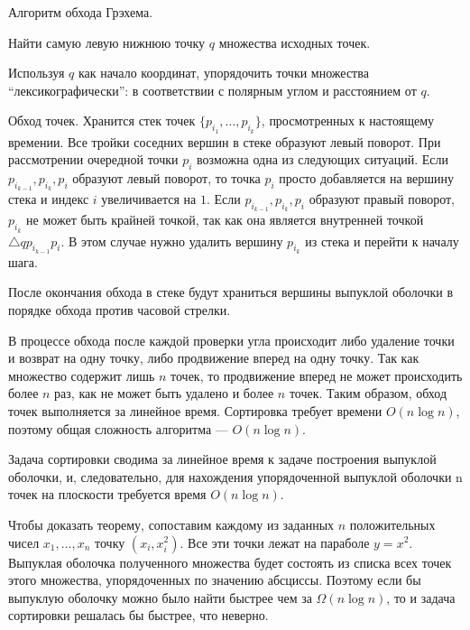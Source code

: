 \begin{algorithm}{Алгоритм обхода Грэхема.}
\item Найти самую левую нижнюю точку $q$ множества исходных точек.
\item Используя $q$ как начало координат, упорядочить точки множества
  ``лексикографически'': в соответствии с полярным углом и расстоянием
  от $q$.
\item Обход точек. Хранится стек точек $\{p_{i_1}, \ldots,p_{i_k}\}$,
  просмотренных к настоящему времении. Все тройки соседних вершин в
  стеке образуют левый поворот. При рассмотрении очередной точки $p_i$
  возможна одна из следующих ситуаций. Если $p_{i_{k-1}},p_{i_k},p_i$
  образуют левый поворот, то точка $p_i$ просто добавляется на вершину
  стека и индекс $i$ увеличивается на $1$.
  Если $p_{i_{k-1}},p_{i_k},p_i$ образуют правый поворот, $p_{i_k}$ не
  может быть крайней точкой, так как она является внутренней точкой
  $\triangle qp_{i_{k-1}}p_i$. В этом случае нужно удалить вершину
  $p_{i_k}$ из стека и перейти к началу шага.
\item После окончания обхода в стеке будут храниться вершины выпуклой
  оболочки в порядке обхода против часовой стрелки.
\end{algorithm}

В процессе обхода после каждой проверки угла происходит либо удаление
точки и возврат на одну точку, либо продвижение вперед на одну точку.
Так как множество содержит лишь $n$ точек, то продвижение вперед не
может происходить более $n$ раз, как не может быть удалено и более $n$
точек. Таким образом, обход точек выполняется за линейное время.
Сортировка требует времени $O(n\log n)$, поэтому общая сложность
алгоритма --- $O(n\log n)$.

\begin{theorem}
  Задача сортировки сводима за линейное время к задаче построения
  выпуклой оболочки, и, следовательно, для нахождения упорядоченной
  выпуклой оболочки n точек на плоскости требуется время $O(n \log n)$.
\end{theorem}

Чтобы доказать теорему, сопоставим каждому из заданных $n$
положительных чисел $x_1, \ldots, x_n$ точку $(x_i, x_i^2)$. Все эти
точки лежат на параболе $y=x^2$. Выпуклая оболочка полученного
множества будет состоять из списка всех точек этого множества,
упорядоченных по значению абсциссы. Поэтому если бы выпуклую оболочку
можно было найти быстрее чем за $\Omega(n\log n)$, то и задача
сортировки решалась бы быстрее, что неверно.

